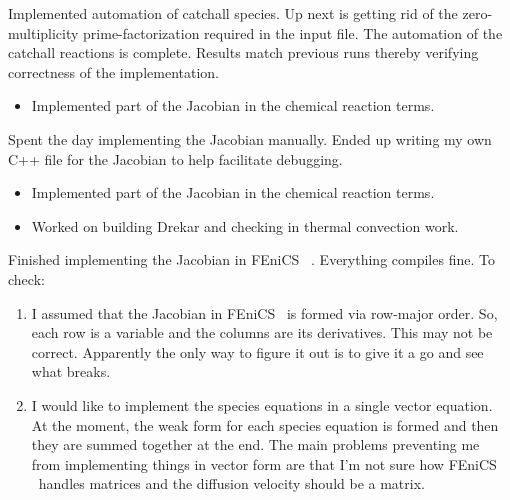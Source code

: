 \documentclass[fontsize=11pt, %
               paper=a4, %
               oneside, %
               captions=tableheading,
               index=totoc,
               hyperref]{labbook}
\newcommand{\fenics}{FEniCS \ }
\begin{document}
Implemented automation of catchall species.  Up next is getting rid of the zero-multiplicity prime-factorization required in the input file.
The automation of the catchall reactions is complete.  Results match previous runs thereby verifying correctness of the implementation.

\begin{itemize}
  \item Implemented part of the Jacobian in the chemical reaction terms.
\end{itemize}


Spent the day implementing the Jacobian manually.  Ended up writing my own C++ file for the Jacobian to help facilitate debugging.

\begin{itemize}
  \item Implemented part of the Jacobian in the chemical reaction terms.
  \item Worked on building Drekar and checking in thermal convection work.
\end{itemize}


Finished implementing the Jacobian in \fenics.  Everything compiles fine.  To check:
\begin{enumerate}
  \item I assumed that the Jacobian in \fenics is formed via row-major order.  So, each row is a variable and the columns are its derivatives.  This may not be correct.  Apparently the only way to figure it out is to give it a go and see what breaks.
  \item I would like to implement the species equations in a single vector equation.  At the moment, the weak form for each species equation is formed and then they are summed together at the end.  The main problems preventing me from implementing things in vector form are that I'm not sure how \fenics handles matrices and the diffusion velocity should be a matrix.
\end{enumerate}
\end{document}
